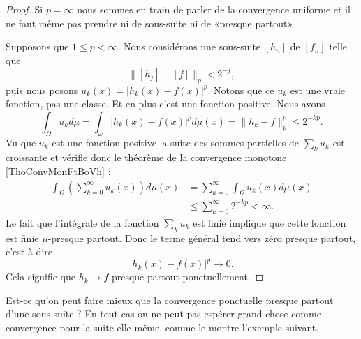 \begin{proof}
    Si \( p=\infty\) nous sommes en train de parler de la convergence uniforme et il ne faut même pas prendre ni de sous-suite ni de «presque partout».

    Supposons que \( 1\leq p<\infty\). Nous considérons une sous-suite \( [h_n]\) de \( [f_n]\) telle que
    \begin{equation}
        \| [h_j]-[f] \|_p<2^{-j},
    \end{equation}
    puis nous posons \( u_k(x)=| h_k(x)-f(x) |^p\). Notons que ce \( u_k\) est une vraie fonction, pas une classe. Et en plus c'est une fonction positive. Nous avons
    \begin{equation}
        \int_{\Omega}u_kd\mu=\int_{\omega}| h_k(x)-f(x) |^pd\mu(x)=\| h_k-f \|_p^p\leq 2^{-kp}.
    \end{equation}
    Vu que \( u_k\) est une fonction positive la suite des sommes partielles de \( \sum_ku_k\) est croissante et vérifie donc le théorème de la convergence monotone \ref{ThoConvMonFtBoVh} :
    \begin{subequations}
        \begin{align}
            \int_{\Omega}\left( \sum_{k=0}^{\infty}u_k(x) \right)d\mu(x)&=\sum_{k=0}^{\infty}\int_{\Omega}u_k(x)d\mu(x)\\
            &\leq\sum_{k=0}^{\infty}2^{-kp}<\infty.
        \end{align}
    \end{subequations}
    Le fait que l'intégrale de la fonction \( \sum_ku_k\) est finie implique que cette fonction est finie \( \mu\)-presque partout. Donc le terme général tend vers zéro presque partout, c'est à dire
    \begin{equation}
        | h_k(x)-f(x) |^p\to 0.
    \end{equation}
    Cela signifie que \( h_k\to f\) presque partout ponctuellement.
\end{proof}

Est-ce qu'on peut faire mieux que la convergence ponctuelle presque partout d'une sous-suite ? En tout cas on ne peut pas espérer grand chose comme convergence pour la suite elle-même, comme le montre l'exemple suivant.

